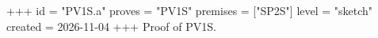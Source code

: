 +++
id = "PV1S.a"
proves = "PV1S"
premises = ["SP2S"]
level = "sketch"
created = 2026-11-04
+++
Proof of PV1S.
